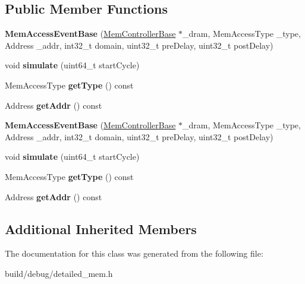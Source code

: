 \subsection*{Public Member Functions}
\begin{DoxyCompactItemize}
\item 
\hypertarget{classMemAccessEventBase_abc754afb4dad414c2e41cb6a78a28783}{{\bfseries Mem\-Access\-Event\-Base} (\hyperlink{classMemControllerBase}{Mem\-Controller\-Base} $\ast$\-\_\-dram, Mem\-Access\-Type \-\_\-type, Address \-\_\-addr, int32\-\_\-t domain, uint32\-\_\-t pre\-Delay, uint32\-\_\-t post\-Delay)}\label{classMemAccessEventBase_abc754afb4dad414c2e41cb6a78a28783}

\item 
\hypertarget{classMemAccessEventBase_a5ef5c4322e608e54eed1930855333f80}{void {\bfseries simulate} (uint64\-\_\-t start\-Cycle)}\label{classMemAccessEventBase_a5ef5c4322e608e54eed1930855333f80}

\item 
\hypertarget{classMemAccessEventBase_ac85f64b8558421bf47cb7a60e990ff17}{Mem\-Access\-Type {\bfseries get\-Type} () const }\label{classMemAccessEventBase_ac85f64b8558421bf47cb7a60e990ff17}

\item 
\hypertarget{classMemAccessEventBase_a9cc9d17bda3a19800a4f11e7e2891632}{Address {\bfseries get\-Addr} () const }\label{classMemAccessEventBase_a9cc9d17bda3a19800a4f11e7e2891632}

\item 
\hypertarget{classMemAccessEventBase_abc754afb4dad414c2e41cb6a78a28783}{{\bfseries Mem\-Access\-Event\-Base} (\hyperlink{classMemControllerBase}{Mem\-Controller\-Base} $\ast$\-\_\-dram, Mem\-Access\-Type \-\_\-type, Address \-\_\-addr, int32\-\_\-t domain, uint32\-\_\-t pre\-Delay, uint32\-\_\-t post\-Delay)}\label{classMemAccessEventBase_abc754afb4dad414c2e41cb6a78a28783}

\item 
\hypertarget{classMemAccessEventBase_a5ef5c4322e608e54eed1930855333f80}{void {\bfseries simulate} (uint64\-\_\-t start\-Cycle)}\label{classMemAccessEventBase_a5ef5c4322e608e54eed1930855333f80}

\item 
\hypertarget{classMemAccessEventBase_ac85f64b8558421bf47cb7a60e990ff17}{Mem\-Access\-Type {\bfseries get\-Type} () const }\label{classMemAccessEventBase_ac85f64b8558421bf47cb7a60e990ff17}

\item 
\hypertarget{classMemAccessEventBase_a9cc9d17bda3a19800a4f11e7e2891632}{Address {\bfseries get\-Addr} () const }\label{classMemAccessEventBase_a9cc9d17bda3a19800a4f11e7e2891632}

\end{DoxyCompactItemize}
\subsection*{Additional Inherited Members}


The documentation for this class was generated from the following file\-:\begin{DoxyCompactItemize}
\item 
build/debug/detailed\-\_\-mem.\-h\end{DoxyCompactItemize}
